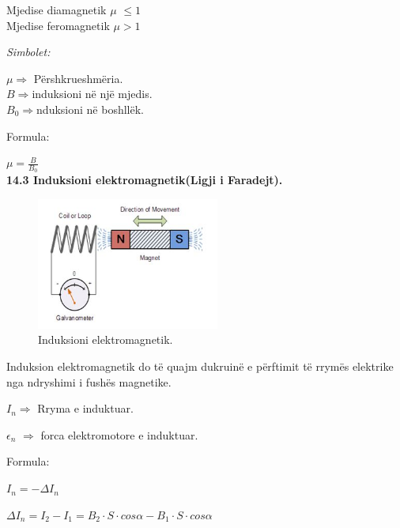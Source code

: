 \documentclass[twocolumn]{article}
\begin{document}
	Mjedise diamagnetik $\mu$ $\leq  1$\\
	
	Mjedise feromagnetik $\mu > 1$\\
	
	\begin{center}
		\textit{Simbolet:}\\
	\end{center}
	
	$\mu \Rightarrow $ Përshkrueshmëria.\\
	
	$B \Rightarrow $induksioni në një mjedis.\\
	
	$B_0 \Rightarrow $nduksioni në boshllëk.\\
	
	\begin{center}
		Formula:
	\end{center}
	
	$\mu=\frac{B}{B_0}$\\
	
	
	\textbf{14.3 Induksioni elektromagnetik(Ligji i Faradejt).}
	
	\begin{figure}[h]
		\includegraphics[width=60mm]{Imazhet/faraday law.jpg}
		\caption{Induksioni elektromagnetik.}
		\label{fig:boat1}
	\end{figure}
	
	Induksion elektromagnetik do të quajm dukruinë e përftimit të rrymës elektrike nga
	ndryshimi i fushës magnetike.
	
	$I_n \Rightarrow $ Rryma e induktuar.
	
	$\epsilon_n$ $\Rightarrow$ forca elektromotore e induktuar.
	
	
	\begin{center}
		Formula:
	\end{center}
	
	$I_n =-\Delta I_n$
	
	$\Delta I_n=I_2-I_1=B_2 \cdot S \cdot cos\alpha - B_1 \cdot S \cdot cos\alpha$\\
	
\end{document}
